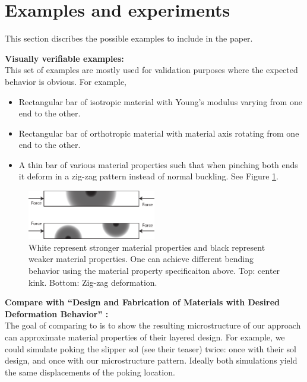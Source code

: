 \section{Examples and experiments}
This section discribes the possible examples to include in the paper.
\begin{description}
\item{\bf Visually verifiable examples:}\\
This set of examples are mostly used for validation purposes where the expected
behavior is obvious.  For example, 
\begin{itemize}
    \item Rectangular bar of isotropic material with Young's modulus varying from one end
        to the other.
    \item Rectangular bar of orthotropic material with material axis rotating
        from one end to the other.
    \item A thin bar of various material properties such that when pinching both
    ends it deform in a zig-zag pattern instead of normal buckling. See Figure
    \ref{fig:zig_zag_bar}.
\end{itemize}
\begin{figure}
\centering
\includegraphics[width=0.5\textwidth]{images/zig_zag_bar}
\caption{White represent stronger material properties and black represent weaker
material properties.  One can achieve different bending behavior using the
material property specificaiton above.  Top: center kink.  Bottom: Zig-zag
deformation.}
\label{fig:zig_zag_bar}
\end{figure}

\item{\bf Compare with ``Design and Fabrication of Materials with Desired
Deformation Behavior'' \cite{Bickel2010}:}\\
The goal of comparing to \cite{Bickel2010} is to show the resulting
microstructure of our approach can approximate material properties of their
layered design.  For example, we could simulate poking the slipper sol (see
their teaser) twice: once with their sol design, and once with our
microstructure pattern.  Ideally both simulations yield the same displacements
of the poking location.


\end{description}
